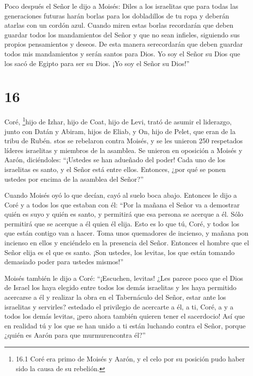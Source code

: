  Poco después el Señor le dijo a Moisés: 
Diles a los israelitas que para todas las generaciones futuras harán
borlas para los dobladillos de tu ropa y deberán atarlas con un cordón
azul.  Cuando miren estas borlas recordarán que deben
guardar todos los mandamientos del Señor y que no sean infieles,
siguiendo sus propios pensamientos y deseos.  De esta
manera serecordarán que deben guardar todos mis mandamientos y serán
santos para Dios. Yo soy el Señor su Dios que los sacó de Egipto para
ser su Dios.  ¡Yo soy el Señor su Dios!''

\hypertarget{section-15}{%
\section{16}\label{section-15}}

 Coré, \footnote{16.1 Coré era primo de Moisés y Aarón, y el
  celo por su posición pudo haber sido la causa de su rebelión.}hijo de
Izhar, hijo de Coat, hijo de Levi, trató de asumir el liderazgo, junto
con Datán y Abiram, hijos de Eliab, y On, hijo de Pelet, que eran de la
tribu de Rubén.  stos se rebelaron contra Moisés, y se les
unieron 250 respetados líderes israelitas y miembros de la asamblea.
 Se unieron en oposición a Moisés y Aarón, diciéndoles:
``¡Ustedes se han adueñado del poder! Cada uno de los israelitas es
santo, y el Señor está entre ellos. Entonces, ¿por qué se ponen ustedes
por encima de la asamblea del Señor?''

 Cuando Moisés oyó lo que decían, cayó al suelo boca abajo.
 Entonces le dijo a Coré y a todos los que estaban con él:
``Por la mañana el Señor va a demostrar quién es suyo y quién es santo,
y permitirá que esa persona se acerque a él. Sólo permitirá que se
acerque a él quien él elija.  Esto es lo que tú, Coré, y
todos los que están contigo van a hacer. Toma unos quemadores de
incienso,  y mañana pon incienso en ellos y enciéndelo en la
presencia del Señor. Entonces el hombre que el Señor elija es el que es
santo. ¡Son ustedes, los levitas, los que están tomando demasiado poder
para ustedes mismos!''

 Moisés también le dijo a Coré: ``¡Escuchen, levitas!
 ¿Les parece poco que el Dios de Israel los haya elegido
entre todos los demás israelitas y les haya permitido acercarse a él y
realizar la obra en el Tabernáculo del Señor, estar ante los israelitas
y servirles?  estedado el privilegio de acercarte a él, a
ti, Coré, a y a todos los demás levitas, ¡pero ahora también quieren
tener el sacerdocio!  Así que en realidad tú y los que se
han unido a ti están luchando contra el Señor, porque ¿quién es Aarón
para que murmurencontra él?''

